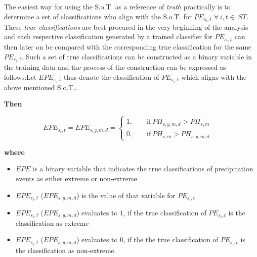 \documentclass[
  12pt,
]{article}
\begin{document}
The easiest way for using the S.o.T. as a reference of \textit{truth}
practically is to determine a set of classifications who align with the
S.o.T. for \(PE_{s_{i},t}\) \(\forall\:i,t\in\:ST\). These
\textit{true classifications} are best procured in the very beginning of
the analysis and each respective classification generated by a trained
classifier for \(PE_{s_{i},t}\) can then later on be compared with the
corresponding true classification for the same \(PE_{s_{i},t}\). Such a
set of true classifications can be constructed as a binary variable in
the training data and the process of the construction can be expressed
as follows:\newline Let \(EPE_{s_{i},t}\) thus denote the classification
of \(PE_{s_{i},t}\) which aligns with the above mentioned S.o.T..

\endgroup

\pagebreak

\begin{center}
\textbf{Then}
\end{center}

\vspace{-0.5cm}

\begin{equation}\label{eq:standard_of_truth}
EPE_{s_i,t} = EPE_{s,y,m,d} =
\begin{cases}
1,\qquad\text{if}\:PH_{s,y,m,d} > \overline{PH}_{s,m}\ \\
0,\qquad\text{if}\:\overline{PH}_{s,m} > PH_{s,y,m,d}
\end{cases}
\end{equation}

\begin{center}
\textbf{where}
\end{center}

\begin{itemize}[label={}]
\item $EPE$ is a binary variable that indicates the true classifications of precipitation events as either extreme or non-extreme
\item $EPE_{s_i,t}$ ($EPE_{s,y,m,d}$) is the value of that variable for $PE_{s_{i},t}$
\item $EPE_{s_i,t}$ ($EPE_{s,y,m,d}$) evaluates to $1$, if the true classification of $PE_{s_{i},t}$ is the classification as extreme
\item $EPE_{s_i,t}$ ($EPE_{s,y,m,d}$) evaluates to $0$, if the the true classification of $PE_{s_{i},t}$ is the classification as non-extreme.
\end{itemize}
\end{document}
